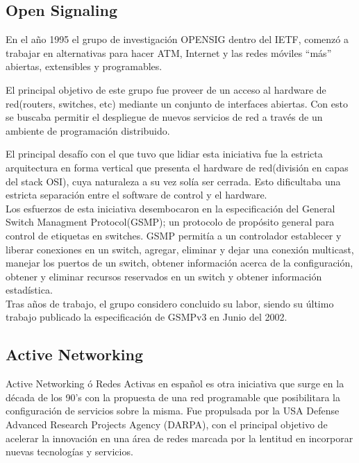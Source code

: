 \subsection{Open Signaling}
En el año 1995 el grupo de investigación OPENSIG\cite{campbell1999open} dentro del IETF, comenzó a trabajar en alternativas para hacer ATM, Internet y las redes móviles ``más'' abiertas, extensibles y programables.

El principal objetivo de este grupo fue proveer de un acceso al hardware de red(routers, switches, etc) mediante un conjunto de interfaces abiertas. Con esto se buscaba permitir el despliegue de nuevos servicios de red a través de un ambiente de programación distribuido.

El principal desafío con el que tuvo que lidiar esta iniciativa fue la estricta arquitectura en forma vertical que presenta el hardware de red(división en capas del stack OSI), cuya naturaleza a su vez solía ser cerrada. Esto dificultaba una estricta separación entre el software de control y el hardware.\\

Los esfuerzos de esta iniciativa desembocaron en la especificación del General Switch Managment Protocol(GSMP); un protocolo de propósito general para control de etiquetas en switches.
GSMP permitía a un controlador establecer y liberar conexiones en un switch, agregar, eliminar
y dejar una conexión multicast, manejar los puertos de un switch, obtener información acerca de la configuración, obtener y eliminar recursos reservados en un switch y obtener información estadística.\\

Tras años de trabajo, el grupo considero concluido su labor, siendo su último trabajo publicado la especificación de GSMPv3 en Junio del 2002\cite{doria2002general}.

\subsection{Active Networking}
Active Networking\citep{tennenhouse1997survey}\citep{tennenhouse2002towards}\citep{moore2001towards} \'o Redes Activas en español es otra iniciativa que surge en la década de los 90's con la propuesta de una red programable que posibilitara la configuración de servicios sobre la misma. Fue propulsada por la USA Defense Advanced Research Projects Agency (DARPA), con el principal objetivo de acelerar la innovación en una área de redes marcada por la lentitud en incorporar nuevas tecnologías y servicios.\\

